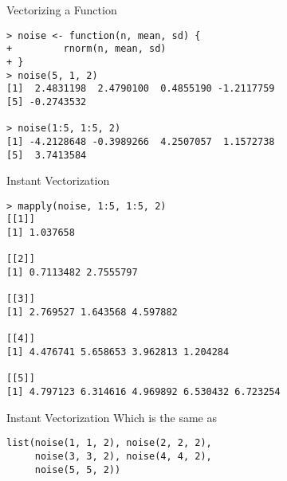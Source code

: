 \documentclass[aspectratio=169]{beamer}
\begin{document}
\begin{frame}[fragile]{Vectorizing a Function}
\begin{verbatim}
> noise <- function(n, mean, sd) {
+         rnorm(n, mean, sd)
+ }
> noise(5, 1, 2)
[1]  2.4831198  2.4790100  0.4855190 -1.2117759
[5] -0.2743532

> noise(1:5, 1:5, 2)
[1] -4.2128648 -0.3989266  4.2507057  1.1572738
[5]  3.7413584
\end{verbatim}
\end{frame}

\begin{frame}[fragile]{Instant Vectorization}
\begin{verbatim}
> mapply(noise, 1:5, 1:5, 2)
[[1]]
[1] 1.037658

[[2]]
[1] 0.7113482 2.7555797

[[3]]
[1] 2.769527 1.643568 4.597882

[[4]]
[1] 4.476741 5.658653 3.962813 1.204284

[[5]]
[1] 4.797123 6.314616 4.969892 6.530432 6.723254
\end{verbatim}
\end{frame}

\begin{frame}[fragile]{Instant Vectorization}
Which is the same as
\begin{verbatim}
list(noise(1, 1, 2), noise(2, 2, 2),
     noise(3, 3, 2), noise(4, 4, 2),
     noise(5, 5, 2))
\end{verbatim}
\end{frame}
\end{document}
